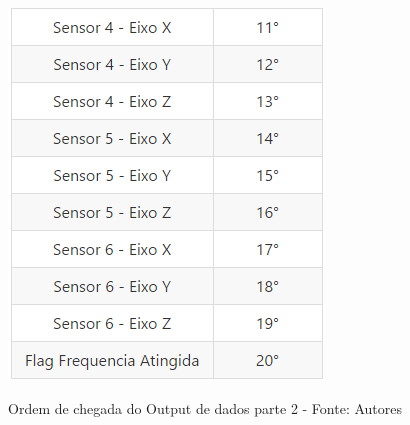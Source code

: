 \begin{figure}[H]
\centering
\includegraphics[keepaspectratio=true,scale=0.8]{figuras/ordem_envio_2.png}
\label{fig:envio_2}
\caption{Ordem de chegada do Output de dados parte 2 - Fonte: Autores}
\end{figure}











